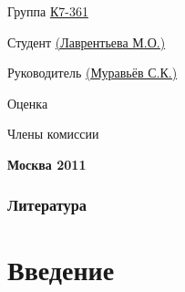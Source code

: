 \documentclass[12pt,a4paper,oneside]{article} %
\begin{document}
\begin{flushleft}
\large{Группа \underline{К7-361\hspace{13cm}}

Студент \underline{\hspace{9,5cm} (Лаврентьева М.О.)}

Руководитель \underline{\hspace{9cm} (Муравьёв С.К.)}

Оценка \underline{\hspace{14,25cm}}

Члены комиссии \underline{\hspace{12,2cm}}

\hspace{3,7cm} \underline{\hspace{12,2cm}}

\hspace{3,7cm} \underline{\hspace{12,2cm}}

\hspace{3,7cm} \underline{\hspace{12,2cm}}}

\end{flushleft}
\begin{center}
\vfill
\large{\textbf{Москва 2011}}
\end{center}
\newpage
\subsubsection*{Литература}
\newpage
\tableofcontents

\newpage
\section{Введение}
\end{document}
